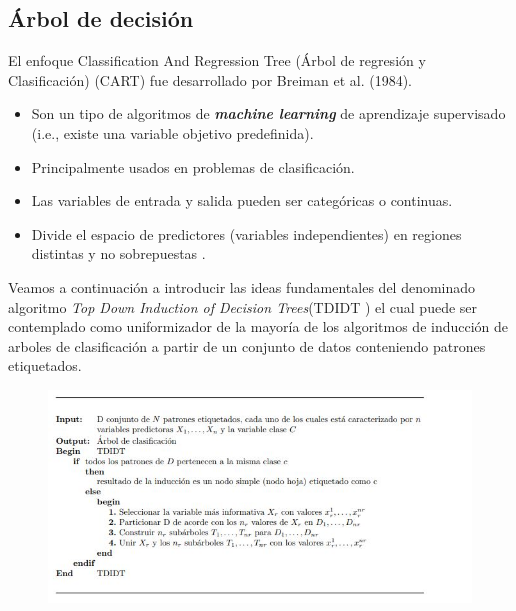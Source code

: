 \documentclass[10pt]{article}
\begin{document}
\subsection{Árbol de decisión}

El enfoque  Classification And Regression Tree (Árbol de regresión y Clasificación) (CART) fue desarrollado por Breiman et al. (1984)\cite{IEEEreferencias:Ref44}.

\begin{itemize}
    \item Son un tipo de algoritmos de \textit{\textbf{machine learning}} de aprendizaje supervisado (i.e., existe una variable objetivo predefinida).
    \item Principalmente usados en problemas de clasificación.
    \item Las variables de entrada y salida pueden ser categóricas o continuas.
    \item Divide el espacio de predictores (variables independientes) en regiones distintas y no sobrepuestas \cite{IEEEreferencias:Ref44}.
\end{itemize}

Veamos a continuación a introducir las ideas fundamentales del denominado algoritmo \textit{Top Down Induction of Decision Trees}(TDIDT ) el cual puede ser contemplado como uniformizador de la mayoría de los algoritmos de inducción de arboles de clasificación a partir de un conjunto de datos conteniendo patrones etiquetados\cite{IEEEreferencias:Ref15}.

\begin{figure}[H]
	\begin{center}
\includegraphics[scale = 0.85]{Imagenes/algoritmo.JPG}
	\end{center} 
\end{figure}
\end{document}
